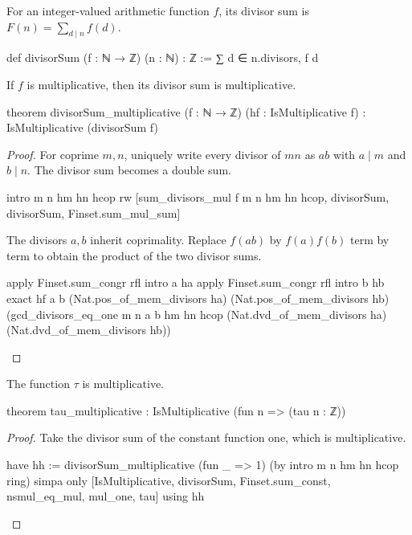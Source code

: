 \begin{definition}
  For an integer-valued arithmetic function $f$, its divisor sum is $F(n)=\sum_{d\mid n}f(d)$.

  \begin{lean}
    def divisorSum (f : ℕ → ℤ) (n : ℕ) : ℤ := ∑ d ∈ n.divisors, f d
  \end{lean}
\end{definition}

\begin{theorem}
  \label{ent:thm:divisorsum-multiplicative}
  If $f$ is multiplicative, then its divisor sum is multiplicative.

  \begin{lean}
    theorem divisorSum_multiplicative (f : ℕ → ℤ) (hf : IsMultiplicative f) :
        IsMultiplicative (divisorSum f)
  \end{lean}
\end{theorem}

\begin{proof}
  For coprime $m,n$, uniquely write every divisor of $mn$ as $ab$ with $a\mid m$ and $b\mid n$.
  The divisor sum becomes a double sum.

  \begin{lean}
    intro m n hm hn hcop
    rw [sum_divisors_mul f m n hm hn hcop, divisorSum, divisorSum, Finset.sum_mul_sum]
  \end{lean}

  The divisors $a,b$ inherit coprimality.
  Replace $f(ab)$ by $f(a)f(b)$ term by term to obtain the product of the two divisor sums.

  \begin{lean}
    apply Finset.sum_congr rfl
    intro a ha
    apply Finset.sum_congr rfl
    intro b hb
    exact hf a b (Nat.pos_of_mem_divisors ha) (Nat.pos_of_mem_divisors hb)
      (gcd_divisors_eq_one m n a b hm hn hcop (Nat.dvd_of_mem_divisors ha)
        (Nat.dvd_of_mem_divisors hb))
  \end{lean}
\end{proof}

\begin{theorem}
  \label{ent:thm:tau-multiplicative}
  The function $\tau$ is multiplicative.

  \begin{lean}
    theorem tau_multiplicative : IsMultiplicative (fun n => (tau n : ℤ))
  \end{lean}
\end{theorem}

\begin{proof}
  Take the divisor sum of the constant function one, which is multiplicative.

  \begin{lean}
    have hh := divisorSum_multiplicative (fun _ => 1) (by
      intro m n hm hn hcop
      ring)
    simpa only [IsMultiplicative, divisorSum, Finset.sum_const, nsmul_eq_mul, mul_one, tau] using hh
  \end{lean}
\end{proof}

